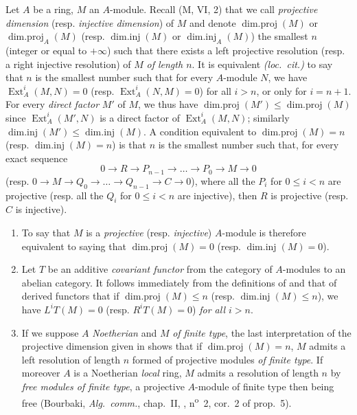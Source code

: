 \begin{env}[17.2.1]
\label{0.17.2.1}
Let $A$ be a ring, $M$ an $A$-module.
Recall (M, VI, 2) that we call \emph{projective dimension} (resp. \emph{injective dimension}) of $M$ and denote $\operatorname{dim.proj}(M)$ or $\operatorname{dim.proj}_A(M)$ (resp. $\operatorname{dim.inj}(M)$ or $\operatorname{dim.inj}_A(M)$) the smallest $n$ (integer or equal to $+\infty$) such that there exists a left projective resolution (resp. a right injective resolution) of $M$ \emph{of length $n$}.
It is equivalent \emph{(loc.\ cit.)} to say that $n$ is the smallest number such that for every $A$-module $N$, we have $\operatorname{Ext}^i_A(M,N)=0$ (resp. $\operatorname{Ext}^i_A(N,M)=0$) for all $i>n$, or only for $i=n+1$.
For every \emph{direct factor} $M'$ of $M$, we thus have $\operatorname{dim.proj}(M')\leq\operatorname{dim.proj}(M)$ since $\operatorname{Ext}^i_A(M',N)$ is a direct factor of $\operatorname{Ext}^i_A(M,N)$;
similarly $\operatorname{dim.inj}(M')\leq\operatorname{dim.inj}(M)$.
A condition equivalent to $\operatorname{dim.proj}(M)=n$ (resp. $\operatorname{dim.inj}(M)=n$) is that $n$ is the smallest number such that, for every exact sequence
\[
  0\to R\to P_{n-1}\to\ldots\to P_0\to M\to 0
\]
(resp. $0\to M\to Q_0\to\ldots\to Q_{n-1}\to C\to 0$), where all the $P_i$ for $0\leq i<n$ are projective (resp. all the $Q_i$ for $0\leq i<n$ are injective), then $R$ is projective (resp. $C$ is injective).
\end{env}

\begin{remarks}[17.2.2]
\label{0.17.2.2}
\begin{enumerate}
  \item[{\rm(i)}] To say that $M$ is a \emph{projective} (resp. \emph{injective}) $A$-module is therefore equivalent to saying that $\operatorname{dim.proj}(M)=0$ (resp. $\operatorname{dim.inj}(M)=0$).
  \item[{\rm(ii)}] Let $T$ be an additive \emph{covariant functor} from the category of $A$-modules to an abelian category.
  It follows immediately from the definitions of  and that of derived functors that if $\operatorname{dim.proj}(M)\leq n$ (resp. $\operatorname{dim.inj}(M)\leq n$), we have $L^i T(M)=0$ (resp. $R^i T(M)=0$) \emph{for all $i>n$}.
  \item[{\rm(iii)}] If we suppose $A$ \emph{Noetherian} and $M$ \emph{of finite type}, the last interpretation of the projective dimension given in  shows that if $\operatorname{dim.proj}(M)=n$, $M$ admits a left resolution of length $n$ formed of projective modules \emph{of finite type}.
  If moreover $A$ is a Noetherian \emph{local} ring, $M$ admits a resolution of length $n$ by \emph{free modules of finite type}, a projective $A$-module of finite type then being free (Bourbaki, \emph{Alg.~comm.}, chap.~II, , n\textsuperscript{o}~2, cor.~2 of prop.~5).
\end{enumerate}
\end{remarks}

